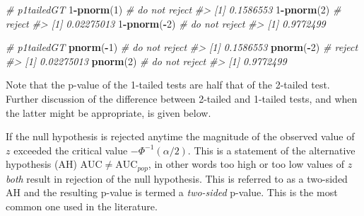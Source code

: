 \documentclass[
]{book}
\newenvironment{Shaded}{\begin{snugshade}}{\end{snugshade}}
\newcommand{\CommentTok}[1]{\textcolor[rgb]{0.56,0.35,0.01}{\textit{#1}}}
\newcommand{\DecValTok}[1]{\textcolor[rgb]{0.00,0.00,0.81}{#1}}
\newcommand{\KeywordTok}[1]{\textcolor[rgb]{0.13,0.29,0.53}{\textbf{#1}}}
\newcommand{\NormalTok}[1]{#1}
\newcommand{\OperatorTok}[1]{\textcolor[rgb]{0.81,0.36,0.00}{\textbf{#1}}}
\begin{document}
\begin{Shaded}
\begin{Highlighting}[]
\CommentTok{\# p1tailedGT}
\DecValTok{1}\OperatorTok{{-}}\KeywordTok{pnorm}\NormalTok{(}\DecValTok{1}\NormalTok{) }\CommentTok{\# do not reject}
\CommentTok{\#\textgreater{} [1] 0.1586553}
\DecValTok{1}\OperatorTok{{-}}\KeywordTok{pnorm}\NormalTok{(}\DecValTok{2}\NormalTok{) }\CommentTok{\# reject}
\CommentTok{\#\textgreater{} [1] 0.02275013}
\DecValTok{1}\OperatorTok{{-}}\KeywordTok{pnorm}\NormalTok{(}\OperatorTok{{-}}\DecValTok{2}\NormalTok{) }\CommentTok{\# do not reject}
\CommentTok{\#\textgreater{} [1] 0.9772499}

\CommentTok{\# p1tailedGT}
\KeywordTok{pnorm}\NormalTok{(}\OperatorTok{{-}}\DecValTok{1}\NormalTok{) }\CommentTok{\# do not reject}
\CommentTok{\#\textgreater{} [1] 0.1586553}
\KeywordTok{pnorm}\NormalTok{(}\OperatorTok{{-}}\DecValTok{2}\NormalTok{) }\CommentTok{\# reject}
\CommentTok{\#\textgreater{} [1] 0.02275013}
\KeywordTok{pnorm}\NormalTok{(}\DecValTok{2}\NormalTok{) }\CommentTok{\# do not reject}
\CommentTok{\#\textgreater{} [1] 0.9772499}
\end{Highlighting}
\end{Shaded}

Note that the p-value of the 1-tailed tests are half that of the 2-tailed test. Further discussion of the difference between 2-tailed and 1-tailed tests, and when the latter might be appropriate, is given below.

If the null hypothesis is rejected anytime the magnitude of the observed value of \(z\) exceeded the critical value \(-\Phi^{-1}\left ( {\alpha/2} \right)\). This is a statement of the alternative hypothesis (AH) \(\text{AUC}\neq \text{AUC}_{pop}\), in other words too high or too low values of \(z\) \emph{both} result in rejection of the null hypothesis. This is referred to as a two-sided AH and the resulting p-value is termed a \emph{two-sided} p-value. This is the most common one used in the literature.
\end{document}
